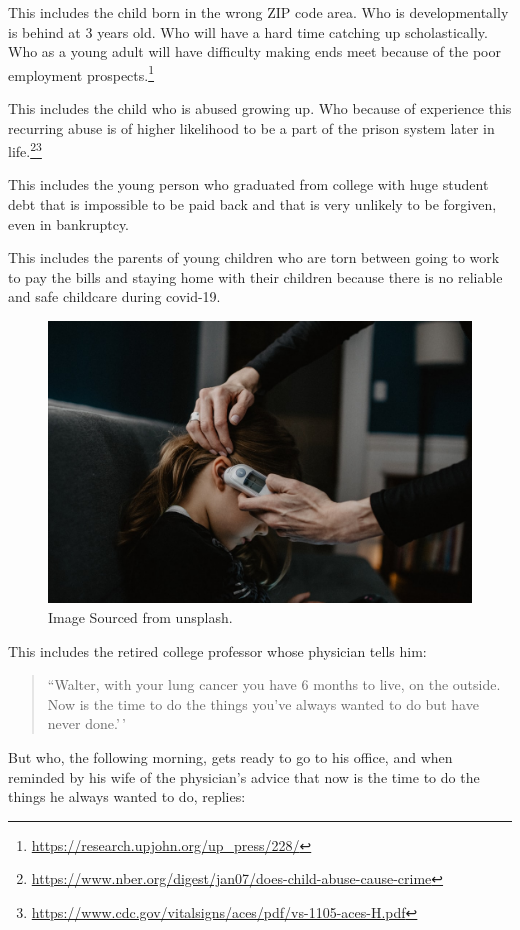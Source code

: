 \documentclass[
]{book}
\begin{document}
This includes the child born in the wrong ZIP code area. Who is developmentally is behind at 3 years old. Who will have a hard time catching up scholastically. Who as a young adult will have difficulty making ends meet because of the poor employment prospects.\footnote{\url{https://research.upjohn.org/up_press/228/}}

This includes the child who is abused growing up. Who because of experience this recurring abuse is of higher likelihood to be a part of the prison system later in life.\footnote{\url{https://www.nber.org/digest/jan07/does-child-abuse-cause-crime}}\footnote{\url{https://www.cdc.gov/vitalsigns/aces/pdf/vs-1105-aces-H.pdf}}

This includes the young person who graduated from college with huge student debt that is impossible to be paid back and that is very unlikely to be forgiven, even in bankruptcy.

This includes the parents of young children who are torn between going to work to pay the bills and staying home with their children because there is no reliable and safe childcare during covid-19.

\begin{figure}

{\centering \includegraphics[width=0.5\linewidth]{img/intro/fig5} 

}

\caption{Image Sourced from unsplash.}\label{fig:intro05}
\end{figure}

This includes the retired college professor whose physician tells him:

\begin{quote}
``Walter, with your lung cancer you have 6 months to live, on the outside. Now is the time to do the things you've always wanted to do but have never done.'\,'
\end{quote}

But who, the following morning, gets ready to go to his office, and when reminded by his wife of the physician's advice that now is the time to do the things he always wanted to do, replies:
\end{document}
